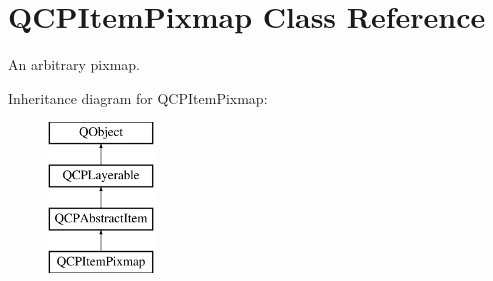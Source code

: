\hypertarget{class_q_c_p_item_pixmap}{}\section{Q\+C\+P\+Item\+Pixmap Class Reference}
\label{class_q_c_p_item_pixmap}


An arbitrary pixmap.  


Inheritance diagram for Q\+C\+P\+Item\+Pixmap\+:\begin{figure}[H]
\begin{center}
\leavevmode
\includegraphics[height=4.000000cm]{class_q_c_p_item_pixmap}
\end{center}
\end{figure}
